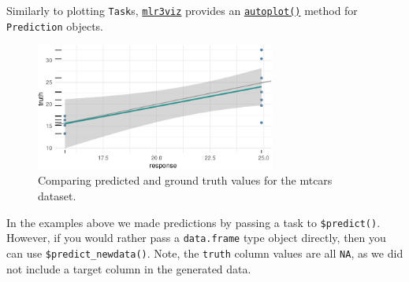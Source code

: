 Similarly to plotting \texttt{Task}s,
\href{https://mlr3viz.mlr-org.com}{\texttt{mlr3viz}}
provides an
\href{https://www.rdocumentation.org/packages/ggplot2/topics/autoplot}{\texttt{autoplot()}}
method for \texttt{Prediction} objects.

\begin{Shaded}
\begin{Highlighting}[]
\OtherTok{=}\SpecialCharTok{$}\SpecialCharTok{$}
\end{Highlighting}
\end{Shaded}

\begin{figure}[H]

{\centering \includegraphics[width=0.7\textwidth,height=\textheight]{chapters/chapter2/data_and_basic_modeling_files/figure-pdf/fig-basics-truthresponse-1.pdf}

}

\caption{\label{fig-basics-truthresponse}Comparing predicted and ground
truth values for the mtcars dataset.}

\end{figure}

In the examples above we made predictions by passing a task to
\texttt{\$predict()}. However, if you would rather pass a
\texttt{data.frame} type object directly, then you can use
\texttt{\$predict\_newdata()}.
Note, the \texttt{truth} column values are all \texttt{NA}, as we did
not include a target column in the generated data.


